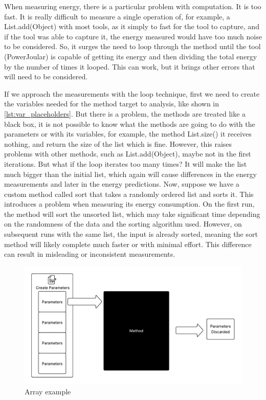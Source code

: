 When measuring energy, there is a particular problem with computation. It is too fast. It is really difficult to measure a single operation of, for example, a List.add(Object) with most tools, as it simply to fast for the tool to capture, and if the tool was able to capture it, the energy measured would have too much noise to be considered. So, it surges the need to loop through the method until the tool (PowerJoular) is capable of getting its energy and then dividing the total energy by the number of times it looped. This can work, but it brings other errors that will need to be considered.

If we approach the measurements with the loop technique, first we need to create the variables needed for the method target to analysis, like shown in \ref{lst:var_placeholders}. But there is a problem, the methods are treated like a black box, it is not possible to know what the methods are going to do with the parameters or with its variables, for example, the method List.size() it receives nothing, and return the size of the list which is fine. However, this raises problems with other methods, such as List.add(Object), maybe not in the first iterations. But what if the loop iterates too many times? It will make the list much bigger than the initial list, which again will cause differences in the energy measurements and later in the energy predictions. 
Now, suppose we have a custom method called sort that takes a randomly ordered list and sorts it. This introduces a problem when measuring its energy consumption. On the first run, the method will sort the unsorted list, which may take significant time depending on the randomness of the data and the sorting algorithm used. However, on subsequent runs with the same list, the input is already sorted, meaning the sort method will likely complete much faster or with minimal effort. This difference can result in misleading or inconsistent measurements.

\begin{figure}[htbp]
  \centering
  \includegraphics[width = 1 \textwidth]{figures/array.pdf}
  \caption{Array example}
  \label{fig:array}
\end{figure}

